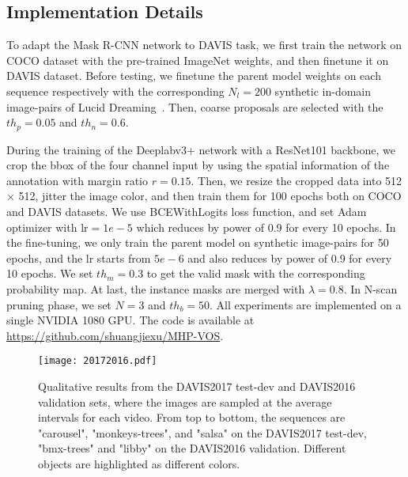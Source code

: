 \documentclass[10pt,twocolumn,letterpaper]{article}
\begin{document}
\subsection{Implementation Details}
\vspace{-5pt}

To adapt the Mask R-CNN \cite{he2017mask} network to DAVIS \cite{perazzi2016benchmark,Pont-Tuset_arXiv_2017,caelles20182018} task, we first train the network on COCO \cite{TsungYi2014Microsoft} dataset with the pre-trained ImageNet \cite{Deng2009ImageNet} weights, and then finetune it on DAVIS dataset. Before testing, we finetune the parent model weights on each sequence respectively with the corresponding $N_l = 200$ synthetic in-domain image-pairs of Lucid Dreaming~\cite{caelles2017one}. Then, coarse proposals are selected with the $th_{p}=0.05$ and $th_{n}=0.6$.



During the training of the Deeplabv3+ \cite{chen2018encoder} network with a ResNet101 \cite{He2015Deep} backbone, we crop the bbox of the four channel input by using the spatial information of the annotation with margin ratio $r=0.15$. Then, we resize the cropped data into 512 $\times$ 512, jitter the image color, and then train them for 100 epochs both on COCO \cite{TsungYi2014Microsoft} and DAVIS \cite{perazzi2016benchmark,Pont-Tuset_arXiv_2017,caelles20182018} datasets. We use BCEWithLogits loss function, and set Adam \cite{Kingma2014Adam} optimizer with $\text{lr}=1e-5$ which reduces by power of 0.9 for every 10 epochs. In the fine-tuning, we only train the parent model on synthetic image-pairs for 50 epochs, and the lr starts from $5e-6$ and also reduces by power of 0.9 for every 10 epochs. We set $th_{m}=0.3$ to get the valid mask with the corresponding probability map. At last, the instance masks are merged with $\lambda=0.8$. In N-scan pruning phase, we set $N=3$ and $th_b=50$. All experiments are implemented on a single NVIDIA 1080 GPU. The code is available at  \href{https://github.com/shuangjiexu/MHP-VOS}{https://github.com/shuangjiexu/MHP-VOS}.

\begin{figure*}[t]
\vspace{-15pt}
\centering
\texttt{[image: 20172016.pdf]}
\vspace{-24pt}
\caption{Qualitative results from the DAVIS2017 test-dev and DAVIS2016 validation sets, where the images are sampled at the average intervals for each video. From top to bottom, the sequences are "carousel", "monkeys-trees", and "salsa" on the DAVIS2017 test-dev, "bmx-trees" and "libby" on the DAVIS2016 validation. Different objects are highlighted as different colors.}
\label{fig:test-dev}
\vspace{-10pt}
\end{figure*}
\end{document}
